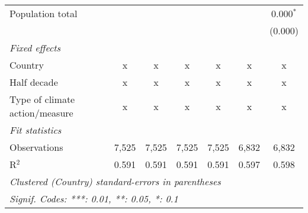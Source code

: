 \begin{tabular}{lcccccc}
   Population total                            &         &         &         &         &         & 0.000$^{*}$\\   
                                               &         &         &         &         &         & (0.000)\\   
   \emph{Fixed effects}\\
   Country                                     & x       & x       & x       & x       & x       & x\\  
   Half decade                                 & x       & x       & x       & x       & x       & x\\  
   Type of climate action/measure              & x       & x       & x       & x       & x       & x\\  
   \midrule \emph{Fit statistics}\\
   Observations                                & 7,525   & 7,525   & 7,525   & 7,525   & 6,832   & 6,832\\  
   R$^2$                                       & 0.591   & 0.591   & 0.591   & 0.591   & 0.597   & 0.598\\  
   \midrule
   \multicolumn{7}{l}{\emph{Clustered (Country) standard-errors in parentheses}}\\
   \multicolumn{7}{l}{\emph{Signif. Codes: ***: 0.01, **: 0.05, *: 0.1}}\\
\end{tabular}
\par\endgroup


